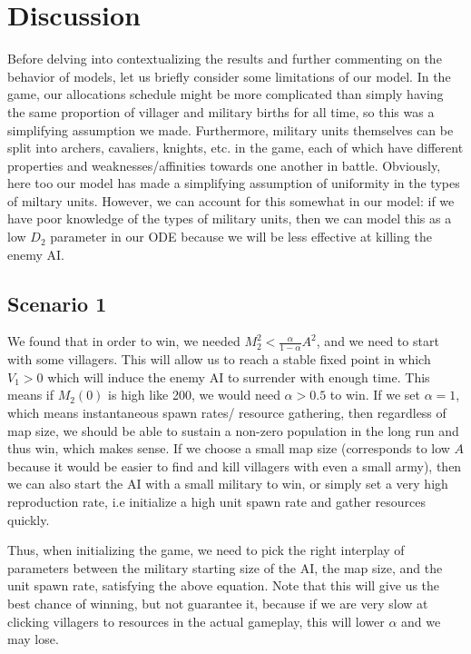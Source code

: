 \documentclass[12pt]{article}
\begin{document}
\section{Discussion}
Before delving into contextualizing the results and further commenting on the behavior of models, let us briefly consider some limitations of our model. In the game, our allocations schedule might be more complicated than simply having the same proportion of villager and military births for all time, so this was a simplifying assumption we made. Furthermore, military units themselves can be split into archers, cavaliers, knights, etc. in the game, each of which have different properties and weaknesses/affinities towards one another in battle. Obviously, here too our model has made a simplifying assumption of uniformity in the types of miltary units. However, we can account for this somewhat in our model: if we have poor knowledge of the types of military units, then we can model this as a low $D_2$ parameter in our ODE because we will be less effective at killing the enemy AI.

\subsection{Scenario 1}
We found that in order to win, we needed $M_2^2 < \frac{\alpha}{1 - \alpha} A^2$, and we need to start with some villagers. This will allow us to reach a stable fixed point in which $V_1 > 0$ which will induce the enemy AI to surrender with enough time. This means if $M_2(0)$ is high like 200, we would need $\alpha > 0.5$ to win. If we set $\alpha = 1$, which means instantaneous spawn rates/ resource gathering, then regardless of map size, we should be able to sustain a non-zero population in the long run and thus win, which makes sense. If we choose a small map size (corresponds to low $A$ because it would be easier to find and kill villagers with even a small army), then we can also start the AI with a small military to win, or simply set a very high reproduction rate, i.e initialize a high unit spawn rate and gather resources quickly. \par

Thus, when initializing the game, we need to pick the right interplay of parameters between the military starting size of the AI, the map size, and the unit spawn rate, satisfying the above equation. Note that this will give us the best chance of winning, but not guarantee it, because if we are very slow at clicking villagers to resources in the actual gameplay, this will lower $\alpha$ and we may lose.  
\end{document}
